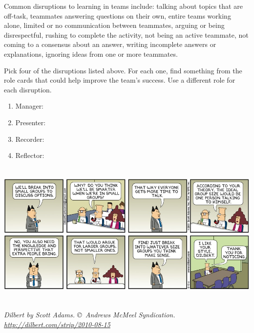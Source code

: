 
Common disruptions to learning in teams include:
  talking about topics that are off-task,
  teammates answering questions on their own,
  entire teams working alone,
  limited or no communication between teammates,
  arguing or being disrespectful,
  rushing to complete the activity,
  not being an active teammate,
  not coming to a consensus about an answer,
  writing incomplete answers or explanations,
  ignoring ideas from one or more teammates.




\Q Pick four of the disruptions listed above.
For each one, find something from the role cards that could help improve the team's success.
Use a different role for each disruption.

\begin{enumerate}
\item Manager: 
\vspace{2em}
\item Presenter: 
\vspace{2em}
\item Recorder: 
\vspace{2em}
\item Reflector: 
\vspace{2em}
\end{enumerate}

\begin{center}
\includegraphics[height=2.85in]{disrupt1.png}
\par \itshape \footnotesize
Dilbert by Scott Adams.
\copyright\ Andrews McMeel Syndication.
\url{http://dilbert.com/strip/2010-08-15}
\end{center}
